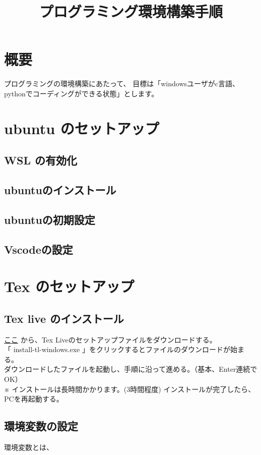 \documentclass[a4paper]{jsarticle}
\author{}
\title{プログラミング環境構築手順}
\date{}
\begin{document}
\maketitle

\section*{\large 概要}
プログラミングの環境構築にあたって、
目標は「windowsユーザがc言語、pythonでコーディングができる状態」とします。
\section{\large ubuntu のセットアップ}
\subsection{WSL の有効化}
\subsection{ubuntuのインストール}
\subsection{ubuntuの初期設定}
\subsection{Vscodeの設定}
\section{\large Tex のセットアップ}
\subsection{Tex live のインストール}
\textcolor{blue}{\href{http://www.tug.org/texlive/acquire-netinstall.html}{ここ}} から、Tex Liveのセットアップファイルをダウンロードする。\\
「 install-tl-windows.exe 」をクリックするとファイルのダウンロードが始まる。\\
ダウンロードしたファイルを起動し、手順に沿って進める。（基本、Enter連続でOK）\\
※ インストールは長時間かかります。(3時間程度)
インストールが完了したら、PCを再起動する。
\subsection{環境変数の設定}
環境変数とは、
\end{document}
